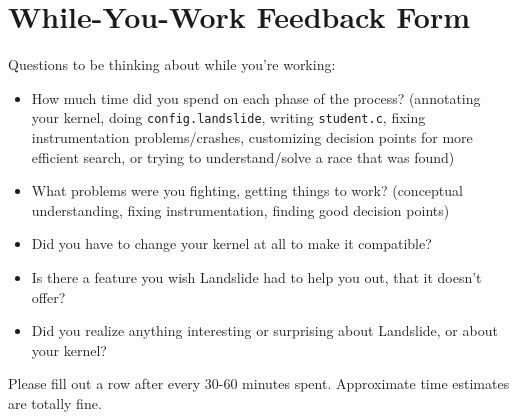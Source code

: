 \documentclass{article}
\begin{document}

\newpage
\section{While-You-Work Feedback Form}
\label{sec:30mins}

Questions to be thinking about while you're working:
\begin{itemize}
	\item How much time did you spend on each phase of the process? (annotating your kernel, doing \texttt{config.landslide}, writing \texttt{student.c}, fixing instrumentation problems/crashes, customizing decision points for more efficient search, or trying to understand/solve a race that was found)
	\item What problems were you fighting, getting things to work? (conceptual understanding, fixing instrumentation, finding good decision points)
	\item Did you have to change your kernel at all to make it compatible?
	\item Is there a feature you wish Landslide had to help you out, that it doesn't offer?
	\item Did you realize anything interesting or surprising about Landslide, or about your kernel?
\end{itemize}
Please fill out a row after every 30-60 minutes spent. Approximate time estimates are totally fine.
\end{document}
